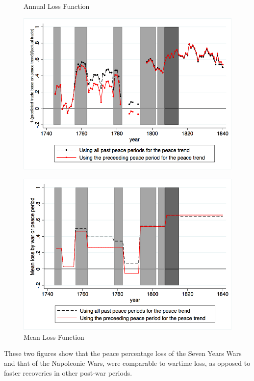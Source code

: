 \documentclass[12pt,a4paper,notitlepage]{article}
\begin{document}
\begin{figure}[H]
	\begin{minipage}[b]{0.45\linewidth}
		\caption{Annual Loss Function}
		\centering
		\label{annual_loss_function}
		\includegraphics[scale=.3]		{Annual_loss_function.png}
	\end{minipage}
	 \hspace{0.5cm}
     \begin{minipage}[b]{0.45\linewidth}
	\caption{Mean Loss Function}
	\label{mean_loss_function}
	\includegraphics[scale=.3]{Mean_loss_function.png}
	\end{minipage}
\end{figure}
These two figures show that the peace percentage loss of the Seven Years Wars and that of the Napoleonic Wars, were comparable to wartime loss, as opposed to faster recoveries in other post-war periods.
\end{document}

